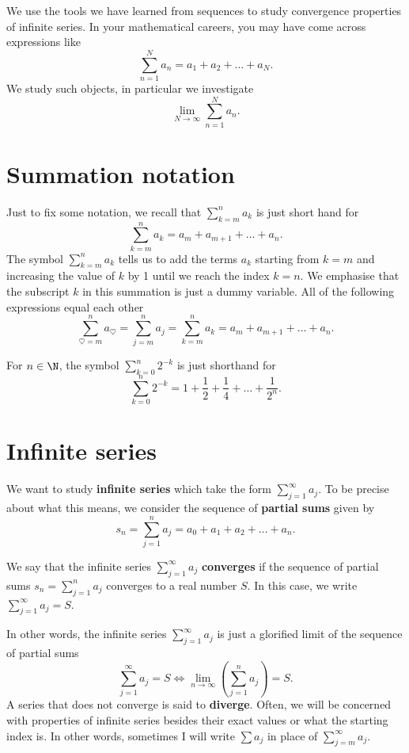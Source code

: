We use the tools we have learned from sequences to study convergence properties of infinite series. In your mathematical careers, you may have come across expressions like
\[
\sum_{n=1}^N a_n = a_1 + a_2 + \dots + a_N.
\]
We study such objects, in particular we investigate
\[
\lim_{N\to\infty} \sum_{n=1}^N a_n.
\]
\section{Summation notation}
Just to fix some notation, we recall that $\sum_{k=m}^na_k$ is just short hand for
\[
\sum_{k=m}^na_k = a_m + a_{m+1}+ \dots + a_n.
\]
The symbol $\sum_{k=m}^na_k$ tells us to add the terms $a_k$ starting from $k=m$ and increasing the value of $k$ by 1 until we reach the index $k=n$. We emphasise that the subscript $k$ in this summation is just a dummy variable. All of the following expressions equal each other
\[
\sum_{\heartsuit=m}^n a_\heartsuit =\sum_{j=m}^n a_j = \sum_{k=m}^na_k = a_m + a_{m+1}+ \dots + a_n.
\]
\begin{eg}
	For $n\in\N$, the symbol $\sum_{k=0}^n2^{-k}$ is just shorthand for
	\[
	\sum_{k=0}^n2^{-k} = 1 + \frac{1}{2} + \frac{1}{4} + \dots + \frac{1}{2^n}.
	\]
\end{eg}
\section{Infinite series}
We want to study \textbf{infinite series} which take the form $\sum_{j=1}^\infty a_j$. To be precise about what this means, we consider the sequence of \textbf{partial sums} given by
\[
s_n = \sum_{j=1}^n a_j = a_0 + a_1 + a_2 + \dots + a_n.
\]
\begin{defn}
	We say that the infinite series $\sum_{j=1}^\infty a_j$ \textbf{converges} if the sequence of partial sums $s_n = \sum_{j=1}^n a_j$ converges to a real number $S$. In this case, we write $\sum_{j=1}^\infty a_j = S$.
\end{defn}
In other words, the infinite series $\sum_{j=1}^\infty a_j$ is just a glorified limit of the sequence of partial sums
\[
\sum_{j=1}^\infty a_j = S \iff \lim_{n\to \infty}\left(\sum_{j=1}^n a_j\right)= S.
\]
A series that does not converge is said to \textbf{diverge}. Often, we will be concerned with properties of infinite series besides their exact values or what the starting index is. In other words, sometimes I will write $\sum a_j$ in place of $\sum_{j=m}^\infty a_j$.

